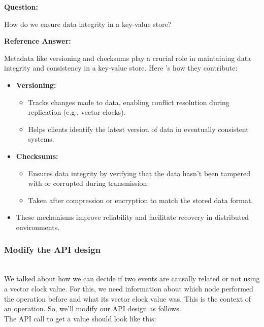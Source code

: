 \textbf{Question:}

How do we ensure data integrity in a key-value store?

\textbf{Reference Answer:}

Metadata like versioning and checksums play a crucial role in maintaining data integrity and consistency in a key-value store. Here 's how they contribute:

\begin{itemize}
\tightlist
\item
\textbf{Versioning:}

\begin{itemize}
\tightlist
\item
Tracks changes made to data, enabling conflict resolution during replication (e.g., vector clocks).\\
\item
Helps clients identify the latest version of data in eventually consistent systems.
\end{itemize}

\item
\textbf{Checksums:}

\begin{itemize}
\tightlist
\item
Ensures data integrity by verifying that the data hasn't been tampered with or corrupted during transmission.\\
\item
Taken after compression or encryption to match the stored data format.\\
\end{itemize}

\item
These mechanisms improve reliability and facilitate recovery in distributed environments.
\end{itemize}

\subsubsection{Modify the API design}\label{hgF6HSb7gCAoPi9ESLok1}
\\
We talked about how we can decide if two events are causally related or not using a vector clock value. For this, we need information about which node performed the operation before and what its vector clock value was. This is the context of an operation. So, we'll modify our API design as follows.
\\
The API call to get a value should look like this:

